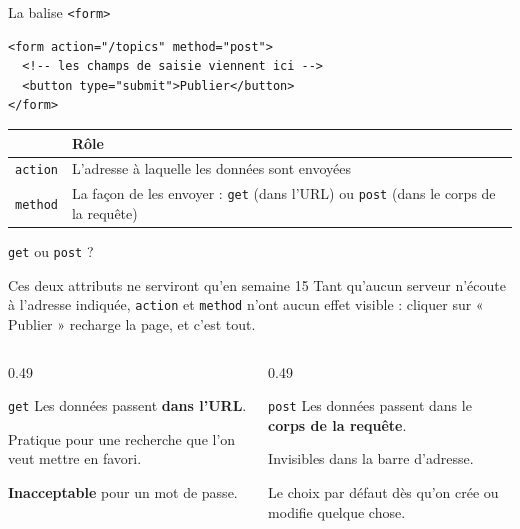 \documentclass[aspectratio=169,11pt]{beamer}
\newcommand{\hdr}[1]{\multicolumn{1}{l}{\color{white}\bfseries #1}}
\begin{document}
\begin{frame}[fragile]{La balise \texttt{<form>}}
\begin{lstlisting}[language=HTML5]
<form action="/topics" method="post">
  <!-- les champs de saisie viennent ici -->
  <button type="submit">Publier</button>
</form>
\end{lstlisting}
  \vspace{0.2cm}
  \begin{center}
  \small
  \begin{tabularx}{0.95\textwidth}{lX}
    \toprule
    \rowcolor{accentBlue}
    \hdr{Attribut} & \hdr{Rôle} \\
    \midrule
    \rowcolor{cfptGrey}
    \texttt{action} & L'adresse à laquelle les données sont envoyées \\
    \texttt{method} & La façon de les envoyer : \texttt{get} (dans l'URL) ou \texttt{post} (dans le corps de la requête) \\
    \bottomrule
  \end{tabularx}
  \end{center}
\end{frame}

\begin{frame}{\texttt{get} ou \texttt{post} ?}
  \begin{alertblock}{Ces deux attributs ne serviront qu'en semaine 15}
    Tant qu'aucun serveur n'écoute à l'adresse indiquée, \texttt{action} et \texttt{method} n'ont aucun effet visible : cliquer sur « Publier » recharge la page, et c'est tout.
  \end{alertblock}
  \vspace{0.2cm}
  \begin{columns}[T]
    \begin{column}{0.49\textwidth}
      \begin{block}{\texttt{get}}
        Les données passent \textbf{dans l'URL}.
        \vspace{0.1cm}

        Pratique pour une recherche que l'on veut mettre en favori.
        \vspace{0.1cm}

        \textcolor{alertRed}{\textbf{Inacceptable}} pour un mot de passe.
      \end{block}
    \end{column}
    \begin{column}{0.49\textwidth}
      \begin{exampleblock}{\texttt{post}}
        Les données passent dans le \textbf{corps de la requête}.
        \vspace{0.1cm}

        Invisibles dans la barre d'adresse.
        \vspace{0.1cm}

        Le choix par défaut dès qu'on crée ou modifie quelque chose.
      \end{exampleblock}
    \end{column}
  \end{columns}
\end{frame}
\end{document}
